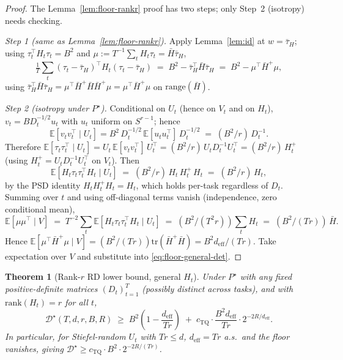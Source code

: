 \documentclass{article}
\newtheorem{theorem}{Theorem}
\theoremstyle{remark}
\newcommand{\E}{\mathbb{E}}
\newcommand{\tr}{\mathrm{tr}}
\newcommand{\rank}{\mathrm{rank}}
\newcommand{\range}{\mathrm{range}}
\newcommand{\deff}{d_{\mathrm{eff}}}
\newcommand{\tauH}{\bar\tau_{H}}
\begin{document}
\begin{proof}
The Lemma~\ref{lem:floor-rankr} proof has two steps; only Step~2
(isotropy) needs checking.

\emph{Step 1 (same as Lemma~\ref{lem:floor-rankr}).} Apply
Lemma~\ref{lem:id} at $w=\tauH$; using $\tau_t^\top H_t\tau_t = B^2$
and $\mu := T^{-1}\sum_t H_t\tau_t = \bar H\tauH$,
\begin{equation}\label{eq:floor-general-det}
  \tfrac1T\sum_t(\tau_t-\tauH)^\top H_t(\tau_t-\tauH)
  \;=\; B^2 - \tauH^\top\bar H\tauH
  \;=\; B^2 - \mu^\top\bar H^+\mu,
\end{equation}
using $\tauH^\top\bar H\tauH = \mu^\top\bar H^+\bar H\bar H^+\mu =
\mu^\top\bar H^+\mu$ on $\range(\bar H)$.

\emph{Step 2 (isotropy under $P^\star$).} Conditional on $U_t$ (hence
on $V_t$ and on $H_t$), $v_t = B D_t^{-1/2}u_t$ with $u_t$ uniform on
$S^{r-1}$; hence
\[
  \E[v_t v_t^\top \mid U_t] = B^2\,D_t^{-1/2}\,\E[u_t u_t^\top]\,D_t^{-1/2}
  \;=\; (B^2/r)\,D_t^{-1}.
\]
Therefore
$\E[\tau_t\tau_t^\top\mid U_t] = U_t\,\E[v_t v_t^\top]\,U_t^\top =
(B^2/r)\,U_t D_t^{-1} U_t^\top = (B^2/r)\,H_t^+$ (using
$H_t^+ = U_t D_t^{-1}U_t^\top$ on $V_t$). Then
\[
  \E[H_t\tau_t\tau_t^\top H_t\mid U_t]
  \;=\; (B^2/r)\,H_t\,H_t^+\,H_t \;=\; (B^2/r)\,H_t,
\]
by the PSD identity $H_t H_t^+ H_t = H_t$, which holds per-task
regardless of $D_t$. Summing over $t$ and using
off-diagonal terms vanish (independence, zero conditional mean),
\[
  \E[\mu\mu^\top\mid V]
  \;=\; T^{-2}\sum_t\E[H_t\tau_t\tau_t^\top H_t\mid U_t]
  \;=\; (B^2/(T^2 r))\sum_t H_t
  \;=\; (B^2/(Tr))\,\bar H.
\]
Hence $\E[\mu^\top\bar H^+\mu \mid V] = (B^2/(Tr))\tr(\bar H^+\bar H)
= B^2\deff/(Tr)$. Take expectation over $V$ and substitute into
\eqref{eq:floor-general-det}.
\end{proof}

\begin{theorem}[Rank-$r$ RD lower bound, general $H_t$]\label{thm:general}
Under $P^\star$ with any fixed positive-definite matrices
$(D_t)_{t=1}^T$ (possibly distinct across tasks), and with
$\rank(H_t) = r$ for all $t$,
\begin{equation}\label{eq:thm-general}
  \mathcal{D}^\star(T,d,r,B,R)
  \;\geq\;
  B^2\!\left(1-\frac{\deff}{Tr}\right)
  \;+\; c_{\mathrm{TQ}}\cdot\frac{B^2\deff}{Tr}\cdot 2^{-2R/\deff}.
\end{equation}
In particular, for Stiefel-random $U_t$ with $Tr\leq d$, $\deff = Tr$
a.s.\ and the floor vanishes, giving
$\mathcal{D}^\star \geq c_{\mathrm{TQ}}\cdot B^2\cdot 2^{-2R/(Tr)}$.
\end{theorem}
\end{document}
